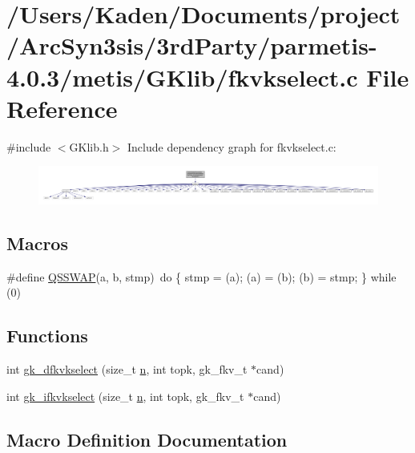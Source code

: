\hypertarget{a00032}{}\section{/\+Users/\+Kaden/\+Documents/project/\+Arc\+Syn3sis/3rd\+Party/parmetis-\/4.0.3/metis/\+G\+Klib/fkvkselect.c File Reference}
\label{a00032}
{\ttfamily \#include $<$G\+Klib.\+h$>$}\newline
Include dependency graph for fkvkselect.\+c\+:\nopagebreak
\begin{figure}[H]
\begin{center}
\leavevmode
\includegraphics[width=350pt]{a00033}
\end{center}
\end{figure}
\subsection*{Macros}
\begin{DoxyCompactItemize}
\item 
\#define \hyperlink{a00032_a9a64796edba94c93b91bba4c1ff73db2}{Q\+S\+S\+W\+AP}(a,  b,  stmp)~do \{ stmp = (a); (a) = (b); (b) = stmp; \} while (0)
\end{DoxyCompactItemize}
\subsection*{Functions}
\begin{DoxyCompactItemize}
\item 
int \hyperlink{a00032_a5883bd40338c9bc48b10124cf32ad7ba}{gk\+\_\+dfkvkselect} (size\+\_\+t \hyperlink{a00623_a781a04ab095280f838ff3eb0e51312e0}{n}, int topk, gk\+\_\+fkv\+\_\+t $\ast$cand)
\item 
int \hyperlink{a00032_a394b3af52f2cb86fa857ee027a3a443f}{gk\+\_\+ifkvkselect} (size\+\_\+t \hyperlink{a00623_a781a04ab095280f838ff3eb0e51312e0}{n}, int topk, gk\+\_\+fkv\+\_\+t $\ast$cand)
\end{DoxyCompactItemize}


\subsection{Macro Definition Documentation}
\mbox{\label{a00032_a9a64796edba94c93b91bba4c1ff73db2}} 
